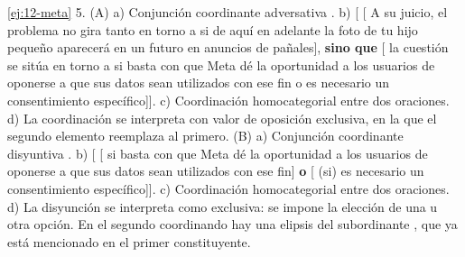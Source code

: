 \begin{solucion}{\ref{ej:12-meta}}
5. (A) a) Conjunción coordinante adversativa . b) [
[ A su juicio, el problema no gira tanto en torno a si de aquí en
adelante la foto de tu hijo pequeño aparecerá en un futuro en anuncios de
pañales], \textbf{sino que} [ la cuestión se sitúa en
torno a si basta con que Meta dé la oportunidad a los usuarios de oponerse a que
sus datos sean utilizados con ese fin o es necesario un consentimiento
específico]]. c) Coordinación homocategorial entre dos oraciones. d) La
coordinación se interpreta con valor de oposición exclusiva, en la que el
segundo elemento reemplaza al primero. (B) a) Conjunción coordinante disyuntiva
. b) [ [ si basta con que Meta dé la
oportunidad a los usuarios de oponerse a que sus datos sean utilizados con ese
fin] \textbf{o} [ (si) es necesario un consentimiento
específico]]. c) Coordinación homocategorial entre dos oraciones. d) La
disyunción se interpreta como exclusiva: se impone la elección de una u otra
opción. En el segundo coordinando hay una elipsis del subordinante ,
que ya está mencionado en el primer constituyente.
\end{solucion}
